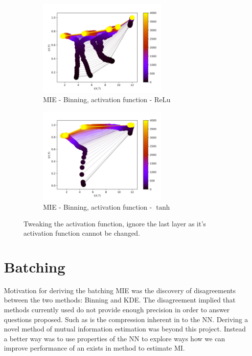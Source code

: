 \documentclass[dissertation.tex]{subfiles}
\begin{document}
\begin{figure}[ht]
  \centering
  \begin{subfigure}[t]{0.49\textwidth}
    \centering
    \includegraphics[width=0.7\textwidth]{figs/eval/activationFunction/BinningRelu.png}
    \caption{
      MIE - Binning, activation function - ReLu
    }
    \label{figReluTanhRelu}
  \end{subfigure}
  \begin{subfigure}[t]{0.49\textwidth}
    \centering
    \includegraphics[width=0.7\textwidth]{figs/eval/activationFunction/BinningTanh.png}
    \caption{
      MIE - Binning, activation function - $\tanh$
    }
    \label{figReluTanhTanh}
  \end{subfigure}
  \caption{
      Tweaking the activation function, ignore the last layer as it's
      activation function cannot be changed.
    }
  \label{figReluTanh}
\end{figure}

\section{Batching} 

Motivation for deriving the batching MIE was the discovery of disagreements
between the two methods: Binning and KDE. The disagreement implied that methods
currently used do not provide enough precision in order to answer questions
proposed. Such as is the compression inherent in to the NN.  Deriving a novel
method of mutual information estimation was beyond this project. Instead a
better way was to use properties of the NN to explore ways how we can improve
performance of an exists in method to estimate MI. 
\end{document}
